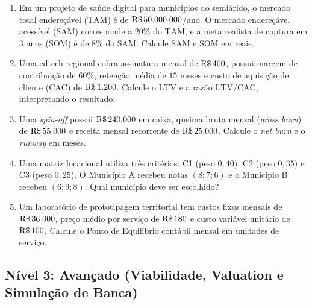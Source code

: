 \begin{enumerate}[leftmargin=1.5em, itemsep=4pt, resume]
  \item Em um projeto de saúde digital para municípios do semiárido, o mercado total endereçável ($\text{TAM}$) é de $\text{R\$\,}{50.000.000}$/ano. O mercado endereçável acessível ($\text{SAM}$) corresponde a $20\%$ do $\text{TAM}$, e a meta realista de captura em 3 anos ($\text{SOM}$) é de $8\%$ do $\text{SAM}$. Calcule $\text{SAM}$ e $\text{SOM}$ em reais.
  \espacoResolucao[2.0cm]

  \item Uma edtech regional cobra assinatura mensal de $\text{R\$\,}{400}$, possui margem de contribuição de $60\%$, retenção média de $15$ meses e custo de aquisição de cliente ($\text{CAC}$) de $\text{R\$\,}{1.200}$. Calcule o $\text{LTV}$ e a razão $\text{LTV/CAC}$, interpretando o resultado.
  \espacoResolucao[2.0cm]

  \item Uma \textit{spin-off} possui $\text{R\$\,}{240.000}$ em caixa, queima bruta mensal (\textit{gross burn}) de $\text{R\$\,}{55.000}$ e receita mensal recorrente de $\text{R\$\,}{25.000}$. Calcule o \textit{net burn} e o \textit{runway} em meses.
  \espacoResolucao[2.0cm]

  \item Uma matriz locacional utiliza três critérios: C1 (peso $0{,}40$), C2 (peso $0{,}35$) e C3 (peso $0{,}25$). O Município A recebeu notas $(8; 7; 6)$ e o Município B recebeu $(6; 9; 8)$. Qual município deve ser escolhido?
  \espacoResolucao[2.0cm]

  \item Um laboratório de prototipagem territorial tem custos fixos mensais de $\text{R\$\,}{36.000}$, preço médio por serviço de $\text{R\$\,}{180}$ e custo variável unitário de $\text{R\$\,}{100}$. Calcule o Ponto de Equilíbrio contábil mensal em unidades de serviço.
  \espacoResolucao[2.0cm]
\end{enumerate}

\subsection*{Nível 3: Avançado (Viabilidade, Valuation e Simulação de Banca)}

